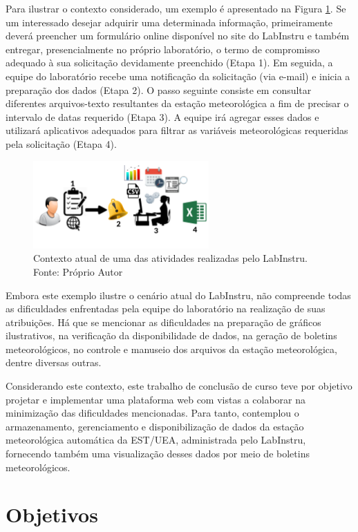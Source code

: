Para ilustrar o contexto considerado, um exemplo é apresentado na Figura \ref{fig:contexto}. Se um interessado desejar adquirir uma determinada informação, primeiramente deverá preencher um formulário online disponível no site do LabInstru e também entregar, presencialmente no próprio laboratório, o termo de compromisso adequado à sua solicitação devidamente preenchido (Etapa 1). Em seguida, a equipe do laboratório recebe uma notificação da solicitação (via e-mail) e inicia a preparação dos dados (Etapa 2). O passo seguinte consiste em consultar diferentes arquivos-texto resultantes da estação meteorológica a fim de precisar o intervalo de datas requerido (Etapa 3). A equipe irá agregar esses dados e utilizará aplicativos adequados para filtrar as variáveis meteorológicas requeridas pela solicitação (Etapa 4).

\begin{figure}[H]
	\centering
	\includegraphics[width=0.6\textwidth]{./img/contexto.png}
	\caption{Contexto atual de uma das atividades realizadas pelo LabInstru. Fonte: Próprio Autor} 			\label{fig:contexto}
\end{figure}

Embora este exemplo ilustre o cenário atual do LabInstru, não compreende todas as dificuldades enfrentadas pela equipe do laboratório na realização de suas atribuições. Há que se mencionar as dificuldades na preparação de gráficos ilustrativos, na verificação da disponibilidade de dados, na geração de boletins meteorológicos, no controle e manuseio dos arquivos da estação meteorológica, dentre diversas outras.

Considerando este contexto, este trabalho de conclusão de curso teve por objetivo projetar e implementar uma plataforma web com vistas a colaborar na minimização das dificuldades mencionadas. Para tanto, contemplou o armazenamento, gerenciamento e disponibilização de dados da estação meteorológica automática da EST/UEA, administrada pelo LabInstru, fornecendo também uma visualização desses dados por meio de boletins meteorológicos.

\section{Objetivos}

